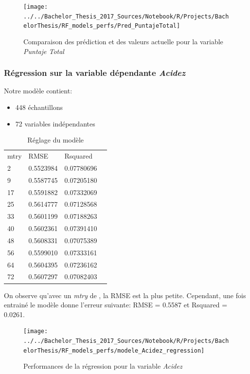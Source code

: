 \begin{figure}[H]
	\centering
	\texttt{[image: ../../Bachelor\_Thesis\_2017\_Sources/Notebook/R/Projects/BachelorThesis/RF\_models\_perfs/Pred\_PuntajeTotal]}
	\caption{Comparaison des prédiction et des valeurs actuelle pour la variable \textit{Puntaje Total}}
	\label{fig:predpuntajetotal}
\end{figure}





\newpage
\subsubsection{Régression sur la variable dépendante \textit{Acidez}}
\noindent Notre modèle contient: 
\begin{itemize}
	\item 448 échantillons
	\item 72 variables indépendantes
\end{itemize}


\begin{table}[H]
	\centering
	\caption{Réglage du modèle}
	\label{RF_Acidez_Resampling}
	\begin{tabular}{llll}
	    mtry & RMSE      & Rsquared   \\
	    2    & 0.5523984 & 0.07780696 \\
	    9    & 0.5587745 & 0.07205180 \\
	    17   & 0.5591882 & 0.07332069 \\
	    25   & 0.5614777 & 0.07128568 \\
	    33   & 0.5601199 & 0.07188263 \\
	    40   & 0.5602361 & 0.07391410 \\
	    48   & 0.5608331 & 0.07075389 \\
	    56   & 0.5599010 & 0.07333161 \\
	    64   & 0.5604395 & 0.07236162 \\
	    72   & 0.5607297 & 0.07082403
	\end{tabular}
\end{table}

\noindent On observe qu'avec un \textit{mtry} de , la RMSE est la plus petite. Cependant, une fois entrainé le modèle donne l'erreur suivante: RMSE = 0.5587  et Rsquared = 0.0261. 

\begin{figure}[H]
	\centering
	\texttt{[image: ../../Bachelor\_Thesis\_2017\_Sources/Notebook/R/Projects/BachelorThesis/RF\_models\_perfs/modele\_Acidez\_regression]}
	\caption{Performances de la régression pour la variable \textit{Acidez}}
	\label{fig:modeleacidezregression}
\end{figure}


